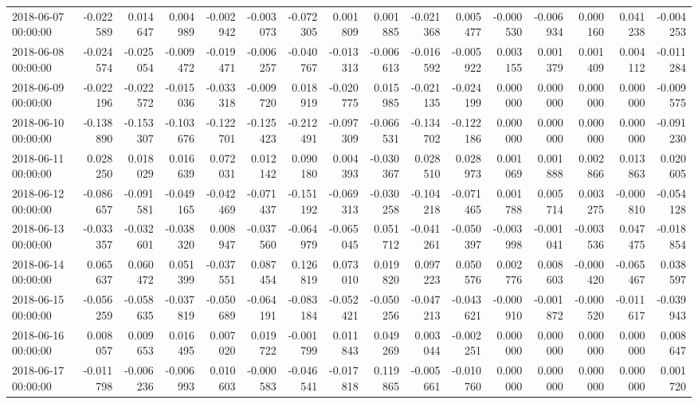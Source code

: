 \begin{tabular}{lrrrrrrrrrrrrrrr}
2018-06-07 00:00:00 & -0.022589 & 0.014647 & 0.004989 & -0.002942 & -0.003073 & -0.072305 & 0.001809 & 0.001885 & -0.021368 & 0.005477 & -0.000530 & -0.006934 & 0.000160 & 0.041238 & -0.004253 \\
2018-06-08 00:00:00 & -0.024574 & -0.025054 & -0.009472 & -0.019471 & -0.006257 & -0.040767 & -0.013313 & -0.006613 & -0.016592 & -0.005922 & 0.003155 & 0.001379 & 0.001409 & 0.004112 & -0.011284 \\
2018-06-09 00:00:00 & -0.022196 & -0.022572 & -0.015036 & -0.033318 & -0.009720 & 0.018919 & -0.020775 & 0.015985 & -0.021135 & -0.024199 & 0.000000 & 0.000000 & 0.000000 & 0.000000 & -0.009575 \\
2018-06-10 00:00:00 & -0.138890 & -0.153307 & -0.103676 & -0.122701 & -0.125423 & -0.212491 & -0.097309 & -0.066531 & -0.134702 & -0.122186 & 0.000000 & 0.000000 & 0.000000 & 0.000000 & -0.091230 \\
2018-06-11 00:00:00 & 0.028250 & 0.018029 & 0.016639 & 0.072031 & 0.012142 & 0.090180 & 0.004393 & -0.030367 & 0.028510 & 0.028973 & 0.001069 & 0.001888 & 0.002866 & 0.013863 & 0.020605 \\
2018-06-12 00:00:00 & -0.086657 & -0.091581 & -0.049165 & -0.042469 & -0.071437 & -0.151192 & -0.069313 & -0.030258 & -0.104218 & -0.071465 & 0.001788 & 0.005714 & 0.003275 & -0.000810 & -0.054128 \\
2018-06-13 00:00:00 & -0.033357 & -0.032601 & -0.038320 & 0.008947 & -0.037560 & -0.064979 & -0.065045 & 0.051712 & -0.041261 & -0.050397 & -0.003998 & -0.001041 & -0.003536 & 0.047475 & -0.018854 \\
2018-06-14 00:00:00 & 0.065637 & 0.060472 & 0.051399 & -0.037551 & 0.087454 & 0.126819 & 0.073010 & 0.019820 & 0.097223 & 0.050576 & 0.002776 & 0.008603 & -0.000420 & -0.065467 & 0.038597 \\
2018-06-15 00:00:00 & -0.056259 & -0.058635 & -0.037819 & -0.050689 & -0.064191 & -0.083184 & -0.052421 & -0.050256 & -0.047213 & -0.043621 & -0.000910 & -0.001872 & -0.000520 & -0.011617 & -0.039943 \\
2018-06-16 00:00:00 & 0.008057 & 0.009653 & 0.016495 & 0.007020 & 0.019722 & -0.001799 & 0.011843 & 0.049269 & 0.003044 & -0.002251 & 0.000000 & 0.000000 & 0.000000 & 0.000000 & 0.008647 \\
2018-06-17 00:00:00 & -0.011798 & -0.006236 & -0.006993 & 0.010603 & -0.000583 & -0.046541 & -0.017818 & 0.119865 & -0.005661 & -0.010760 & 0.000000 & 0.000000 & 0.000000 & 0.000000 & 0.001720 \\

\end{tabular}
